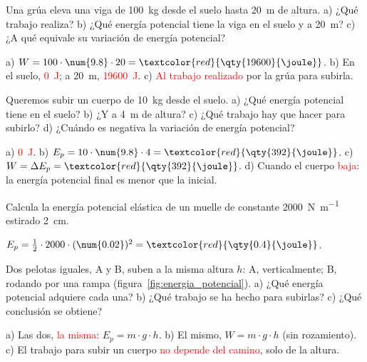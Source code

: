 \begin{exercise}
    Una grúa eleva una viga de \qty{100}{\kg} desde el suelo hasta \qty{20}{\m} de altura. a) ¿Qué trabajo realiza? b) ¿Qué energía potencial tiene la viga en el suelo y a \qty{20}{\m}? c) ¿A qué equivale su variación de energía potencial?
    \begin{solu}
        a) \(W = 100 \cdot \num{9.8} \cdot 20 = \textcolor{red}{\qty{19600}{\joule}}\). b) En el suelo, \textcolor{red}{\qty{0}{\joule}}; a \qty{20}{\m}, \textcolor{red}{\qty{19600}{\joule}}. c) \textcolor{red}{Al trabajo realizado} por la grúa para subirla.
    \end{solu}
\end{exercise}

\begin{exercise}
    Queremos subir un cuerpo de \qty{10}{\kg} desde el suelo. a) ¿Qué energía potencial tiene en el suelo? b) ¿Y a \qty{4}{\m} de altura? c) ¿Qué trabajo hay que hacer para subirlo? d) ¿Cuándo es negativa la variación de energía potencial?
    \begin{solu}
        a) \textcolor{red}{\qty{0}{\joule}}. b) \(E_p = 10 \cdot \num{9.8} \cdot 4 = \textcolor{red}{\qty{392}{\joule}}\). c) \(W = \Delta E_p = \textcolor{red}{\qty{392}{\joule}}\). d) Cuando el cuerpo \textcolor{red}{baja}: la energía potencial final es menor que la inicial.
    \end{solu}
\end{exercise}

\begin{exercise}
    Calcula la energía potencial elástica de un muelle de constante \qty{2000}{\newton\per\m} estirado \qty{2}{\cm}.
    \begin{solu}
        \(E_p = \frac{1}{2} \cdot 2000 \cdot (\num{0.02})^2 = \textcolor{red}{\qty{0.4}{\joule}}\).
    \end{solu}
\end{exercise}

\begin{exercise}
    Dos pelotas iguales, A y B, suben a la misma altura \(h\): A, verticalmente; B, rodando por una rampa (figura~\ref{fig:energia_potencial}). a) ¿Qué energía potencial adquiere cada una? b) ¿Qué trabajo se ha hecho para subirlas? c) ¿Qué conclusión se obtiene?
    \begin{solu}
        a) Las dos, \textcolor{red}{la misma}: \(E_p = m \cdot g \cdot h\). b) El mismo, \(W = m \cdot g \cdot h\) (sin rozamiento). c) El trabajo para subir un cuerpo \textcolor{red}{no depende del camino}, solo de la altura.
    \end{solu}
\end{exercise}

